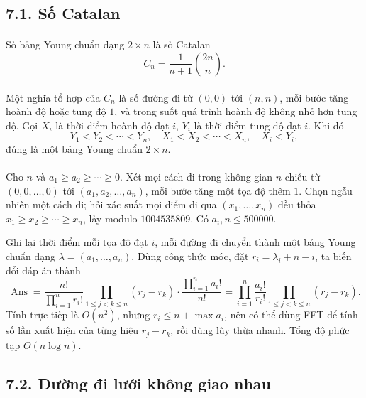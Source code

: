 \documentclass[11pt]{article}
\begin{document}
\subsection*{7.1. Số Catalan}

\paragraph{}
Số bảng Young chuẩn dạng \(2\times n\) là số Catalan
\[
C_n=\frac1{n+1}\binom{2n}{n}.
\]

\paragraph{}
Một nghĩa tổ hợp của \(C_n\) là số đường đi từ \((0,0)\) tới \((n,n)\), mỗi
bước tăng hoành độ hoặc tung độ \(1\), và trong suốt quá trình hoành độ không
nhỏ hơn tung độ. Gọi \(X_i\) là thời điểm hoành độ đạt \(i\), \(Y_i\) là thời
điểm tung độ đạt \(i\). Khi đó
\[
Y_1<Y_2<\cdots<Y_n,\quad X_1<X_2<\cdots<X_n,\quad X_i<Y_i,
\]
đúng là một bảng Young chuẩn \(2\times n\).

\paragraph{}
Cho \(n\) và \(a_1\ge a_2\ge\cdots\ge0\). Xét mọi cách đi trong không gian
\(n\) chiều từ \((0,0,\ldots,0)\) tới \((a_1,a_2,\ldots,a_n)\), mỗi bước tăng
một tọa độ thêm \(1\). Chọn ngẫu nhiên một cách đi; hỏi xác suất mọi điểm đi
qua \((x_1,\ldots,x_n)\) đều thỏa \(x_1\ge x_2\ge\cdots\ge x_n\), lấy modulo
\(1004535809\). Có \(a_i,n\le500000\).

Ghi lại thời điểm mỗi tọa độ đạt \(i\), mỗi đường đi chuyển thành một bảng
Young chuẩn dạng \(\lambda=(a_1,\ldots,a_n)\). Dùng công thức móc, đặt
\(r_i=\lambda_i+n-i\), ta biến đổi đáp án thành
\[
\operatorname{Ans}=
\frac{n!}{\prod_{i=1}^n r_i!}
\prod_{1\le j<k\le n}(r_j-r_k)
\cdot
\frac{\prod_{i=1}^n a_i!}{n!}
=
\prod_{i=1}^n\frac{a_i!}{r_i!}
\prod_{1\le j<k\le n}(r_j-r_k).
\]
Tính trực tiếp là \(O(n^2)\), nhưng \(r_i\le n+\max a_i\), nên có thể dùng
FFT để tính số lần xuất hiện của từng hiệu \(r_j-r_k\), rồi dùng lũy thừa
nhanh. Tổng độ phức tạp \(O(n\log n)\).

\subsection*{7.2. Đường đi lưới không giao nhau}
\end{document}
